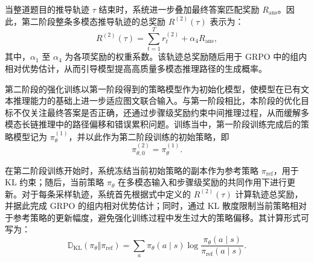 当整道题目的推导轨迹 $\tau$ 结束时，系统进一步叠加最终答案匹配奖励 $R_{\mathrm{ans}}$。因此，第二阶段整条多模态推导轨迹的总奖励 $R^{(2)}(\tau)$ 表示为：
\begin{equation}
  R^{(2)}(\tau) = \sum_{t=1}^{T} r_t^{(2)} + \alpha_4 R_{\mathrm{ans}},
\end{equation}
其中，$\alpha_1$ 至 $\alpha_4$ 为各项奖励的权重系数。该轨迹总奖励随后用于 GRPO 中的组内相对优势估计，从而引导模型提高高质量多模态推理路径的生成概率。



第二阶段的强化训练以第一阶段得到的策略模型作为初始化模型，使模型在已有文本推理能力的基础上进一步适应图文联合输入。与第一阶段相比，本阶段的优化目标不仅关注最终答案是否正确，还通过步骤级奖励约束中间推理过程，从而缓解多模态长链推理中的路径偏移和错误累积问题。训练当中，第一阶段训练完成后的策略模型记为 $\pi_{\theta}^{(1)}$，并以此作为第二阶段训练的初始策略，即
\begin{equation}
  \pi_{\theta,0}^{(2)} = \pi_{\theta}^{(1)}.
\end{equation}

在第二阶段训练开始时，系统冻结当前初始策略的副本作为参考策略 $\pi_{\mathrm{ref}}$，用于 KL 约束；随后，当前策略 $\pi_{\theta}$ 在多模态输入和步骤级奖励的共同作用下进行更新。对于每条采样轨迹，系统首先根据式中定义的 $R^{(2)}(\tau)$ 计算轨迹总奖励，并据此完成 GRPO 的组内相对优势估计；同时，通过 KL 散度限制当前策略相对于参考策略的更新幅度，避免强化训练过程中发生过大的策略偏移。其计算形式可写为：
\begin{equation}
  \mathbb{D}_{\mathrm{KL}}(\pi_{\theta}\Vert \pi_{\mathrm{ref}})
  =
  \sum_{a}\pi_{\theta}(a\mid s)\log\frac{\pi_{\theta}(a\mid s)}{\pi_{\mathrm{ref}}(a\mid s)}.
\end{equation}



